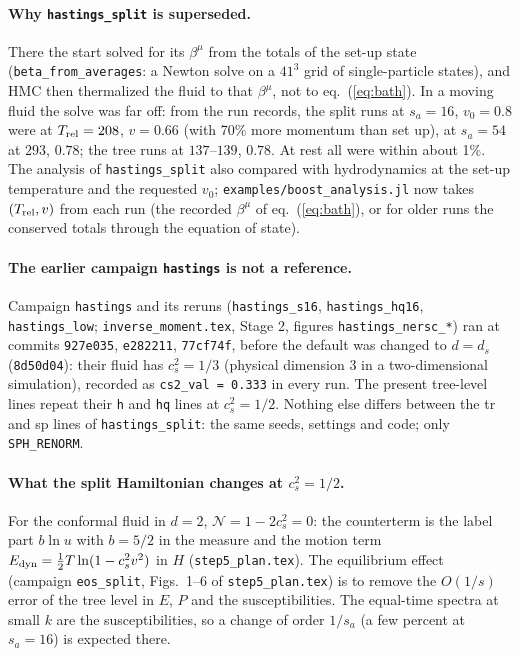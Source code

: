 \documentclass[11pt,aps,preprint,nofootinbib,superscriptaddress,tightenlines]{revtex4-2}
\def\Eq#1{eq.~(\ref{#1})}
\let\oldparagraph\paragraph
\renewcommand{\paragraph}{\par\bigskip\oldparagraph}
\begin{document}
\paragraph{Why \texttt{hastings\_split} is superseded.}  There the start solved for its $\beta^\mu$ from the totals of the set-up state
(\texttt{beta\_from\_averages}: a Newton solve on a $41^3$ grid of single-particle states), and HMC then thermalized the fluid to that
$\beta^\mu$, not to \Eq{eq:bath}.  In a moving fluid the solve was far off: from the run records, the split runs at $s_a=16$, $v_0=0.8$
were at $T_{\rm rel}=208$, $v=0.66$ (with 70\% more momentum than set up), at $s_a=54$ at $293$, $0.78$; the tree runs at $137$--$139$,
$0.78$.  At rest all were within about 1\%.  The analysis of \texttt{hastings\_split} also compared with hydrodynamics at the set-up
temperature and the requested $v_0$; \texttt{examples/boost\_analysis.jl} now takes $(T_{\rm rel},v)$ from each run (the recorded
$\beta^\mu$ of \Eq{eq:bath}, or for older runs the conserved totals through the equation of state).

\paragraph{The earlier campaign \texttt{hastings} is not a reference.}  Campaign \texttt{hastings} and its reruns
(\texttt{hastings\_s16}, \texttt{hastings\_hq16}, \texttt{hastings\_low}; \texttt{inverse\_moment.tex}, Stage 2, figures
\texttt{hastings\_nersc\_*}) ran at commits \texttt{927e035}, \texttt{e282211}, \texttt{77cf74f}, before the default was changed to
$d=d_s$ (\texttt{8d50d04}): their fluid has $c_s^2=1/3$ (physical dimension 3 in a two-dimensional simulation), recorded as
\texttt{cs2\_val = 0.333} in every run.  The present tree-level lines repeat their \texttt{h} and \texttt{hq} lines at $c_s^2=1/2$.
Nothing else differs between the tr and sp lines of \texttt{hastings\_split}: the same seeds, settings and code; only
\texttt{SPH\_RENORM}.

\paragraph{What the split Hamiltonian changes at $c_s^2=1/2$.}  For the conformal fluid in $d=2$, $\mathcal N=1-2c_s^2=0$: the counterterm
is the label part $b\ln u$ with $b=5/2$ in the measure and the motion term $E_{\rm dyn}=\tfrac12T\ln(1-c_s^2v^2)$ in $H$
(\texttt{step5\_plan.tex}).  The equilibrium effect (campaign \texttt{eos\_split}, Figs.~1--6 of \texttt{step5\_plan.tex}) is to remove the
$O(1/s)$ error of the tree level in $E$, $P$ and the susceptibilities.  The equal-time spectra at small $k$ are the susceptibilities,
so a change of order $1/s_a$ (a few percent at $s_a=16$) is expected there.
\end{document}
